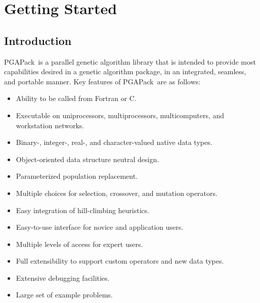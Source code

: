 \documentclass{report}
\newcommand{\pga}{PGAPack}
\begin{document}
\part{Getting Started}\label{part:started}


\chapter{Introduction}\label{chp:intro}

\pga\ is a parallel genetic algorithm library that is intended to provide most
capabilities desired in a genetic algorithm package, in an integrated,
seamless, and portable manner.  Key features of \pga\ are as follows:
\begin{itemize}
\item Ability to be called from Fortran or C.
\item Executable on uniprocessors, multiprocessors, multicomputers, and workstation
networks.
\item Binary-, integer-, real-, and character-valued native data types.
\item Object-oriented data structure neutral design. 
\item Parameterized population replacement.
\item Multiple choices for selection, crossover, and mutation operators.
\item Easy integration of hill-climbing heuristics. 
\item Easy-to-use  interface for novice and application users.
\item Multiple levels of access for expert users.
\item Full extensibility to support custom operators and new data types.
\item Extensive debugging facilities.
\item Large set of example problems.
\end{itemize}
\end{document}
